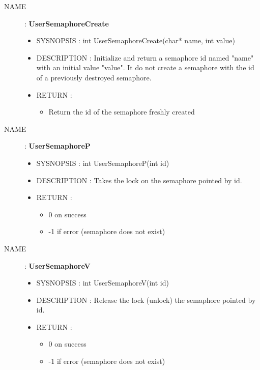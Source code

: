 \begin{description}
    \item [NAME] : \textbf{UserSemaphoreCreate}
        \begin{itemize}
            \item SYSNOPSIS : int UserSemaphoreCreate(char* name, int value)
            \item DESCRIPTION :
                Initialize and return a semaphore id named "name" with an initial value "value".
                It do not create a semaphore with the id of a previously destroyed semaphore.
            \item RETURN :
                \begin{itemize}
                    \item Return the id of the semaphore freshly created
                \end{itemize}
        \end{itemize}

    \item [NAME] : \textbf{UserSemaphoreP}
        \begin{itemize}
            \item SYSNOPSIS : int UserSemaphoreP(int id)
            \item DESCRIPTION :
                Takes the lock on the semaphore pointed by id.
            \item RETURN :
                \begin{itemize}
                    \item 0 on success
                    \item -1 if error (semaphore does not exist)
                \end{itemize}
        \end{itemize}

    \item [NAME] : \textbf{UserSemaphoreV}
        \begin{itemize}
            \item SYSNOPSIS : int UserSemaphoreV(int id)
            \item DESCRIPTION :
                Release the lock (unlock) the semaphore pointed by id.
            \item RETURN :
                \begin{itemize}
                    \item 0 on success
                    \item -1 if error (semaphore does not exist)
                \end{itemize}
        \end{itemize}


\end{description}
